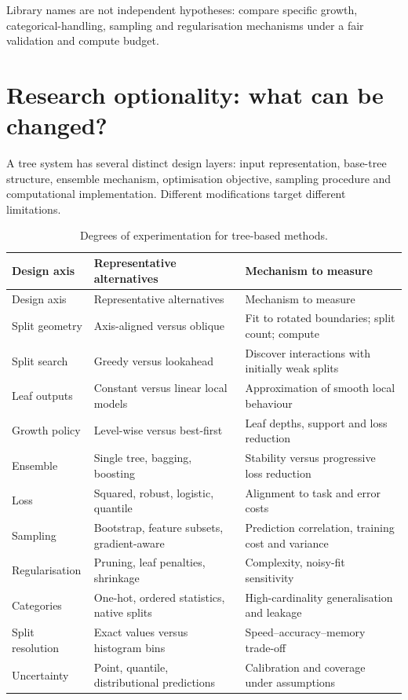 \begin{calloutpractical}
Library names are not independent hypotheses: compare specific growth, categorical-handling, sampling and regularisation mechanisms under a fair validation and compute budget.
\end{calloutpractical}

\section{Research optionality: what can be changed?}
\label{sec:trees-research-optionality-what-can-be-changed}
A tree system has several distinct design layers: input representation, base-tree structure, ensemble mechanism, optimisation objective, sampling procedure and computational implementation.
Different modifications target different limitations.

\small
\begin{longtable}{@{}L{.21\linewidth}L{.35\linewidth}L{.35\linewidth}@{}}
\caption{Degrees of experimentation for tree-based methods.}\label{tab:tree_research_axes}\\
\toprule Design axis & Representative alternatives & Mechanism to measure\\\midrule\endfirsthead
\toprule Design axis & Representative alternatives & Mechanism to measure\\\midrule\endhead
Split geometry & Axis-aligned versus oblique & Fit to rotated boundaries; split count; compute\\
Split search & Greedy versus lookahead & Discover interactions with initially weak splits\\
Leaf outputs & Constant versus linear local models & Approximation of smooth local behaviour\\
Growth policy & Level-wise versus best-first & Leaf depths, support and loss reduction\\
Ensemble & Single tree, bagging, boosting & Stability versus progressive loss reduction\\
Loss & Squared, robust, logistic, quantile & Alignment to task and error costs\\
Sampling & Bootstrap, feature subsets, gradient-aware & Prediction correlation, training cost and variance\\
Regularisation & Pruning, leaf penalties, shrinkage & Complexity, noisy-fit sensitivity\\
Categories & One-hot, ordered statistics, native splits & High-cardinality generalisation and leakage\\
Split resolution & Exact values versus histogram bins & Speed--accuracy--memory trade-off\\
Uncertainty & Point, quantile, distributional predictions & Calibration and coverage under assumptions\\
\bottomrule\end{longtable}
\normalsize

